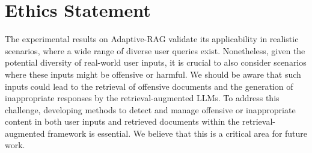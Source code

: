 \section*{Ethics Statement}
The experimental results on Adaptive-RAG validate its applicability in realistic scenarios, where a wide range of diverse user queries exist. Nonetheless, given the potential diversity of real-world user inputs, it is crucial to also consider scenarios where these inputs might be offensive or harmful. We should be aware that such inputs could lead to the retrieval of offensive documents and the generation of inappropriate responses by the retrieval-augmented LLMs. To address this challenge, developing methods to detect and manage offensive or inappropriate content in both user inputs and retrieved documents within the retrieval-augmented framework is essential. We believe that this is a critical area for future work.
